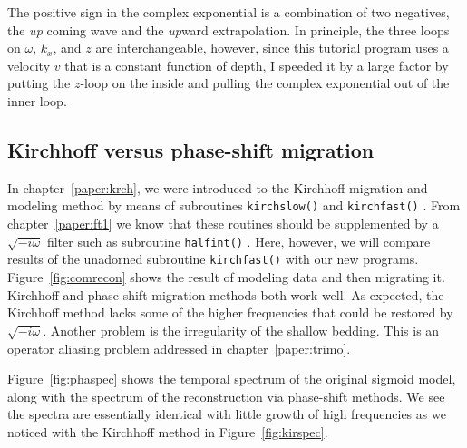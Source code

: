 \par
The positive sign in the complex exponential is a combination of two negatives,
the {\em  up}
coming wave and the {\em  up}ward extrapolation.
In principle,
the three loops on  $\omega$, $k_x$, and  $z$  are interchangeable,
however, since this tutorial program uses
a velocity $v$ that is a constant function of depth,
I speeded it by a large factor by putting the $z$-loop on the inside
and pulling the complex exponential out of the inner loop.

\subsection{Kirchhoff versus phase-shift migration}
In chapter~\ref{paper:krch}, we were introduced to the Kirchhoff
migration and modeling method by means of subroutines
\texttt{kirchslow()}  and \texttt{kirchfast()} .
From chapter~\ref{paper:ft1} we know that these routines should be
supplemented by a $\sqrt{-i\omega}$
filter such as subroutine \texttt{halfint()} .
Here, however,
we will compare results of the unadorned subroutine \texttt{kirchfast()} 
with our new programs.
Figure~\ref{fig:comrecon} shows the result of modeling data and then migrating it.
Kirchhoff and phase-shift migration methods both work well.
As expected, the Kirchhoff method lacks some of the higher frequencies
that could be restored by $\sqrt{-i\omega}$.
Another problem is the irregularity of the shallow bedding.
This is an operator aliasing problem
addressed in chapter~\ref{paper:trimo}.


Figure~\ref{fig:phaspec} shows the temporal spectrum of the original sigmoid model,
along with the spectrum of the reconstruction via phase-shift methods.
We see the spectra are essentially identical
with little growth of high frequencies
as we noticed with the Kirchhoff method
in Figure~\ref{fig:kirspec}.

